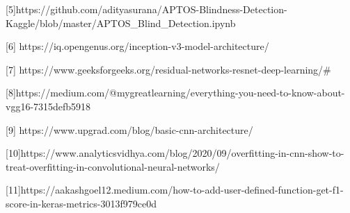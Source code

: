\documentclass[
]{article}
\begin{document}
{[}5{]}https://github.com/adityasurana/APTOS-Blindness-Detection-Kaggle/blob/master/APTOS\_Blind\_Detection.ipynb

{[}6{]} https://iq.opengenus.org/inception-v3-model-architecture/

{[}7{]}
https://www.geeksforgeeks.org/residual-networks-resnet-deep-learning/\#

{[}8{]}https://medium.com/@mygreatlearning/everything-you-need-to-know-about-vgg16-7315defb5918

{[}9{]} https://www.upgrad.com/blog/basic-cnn-architecture/

{[}10{]}https://www.analyticsvidhya.com/blog/2020/09/overfitting-in-cnn-show-to-treat-overfitting-in-convolutional-neural-networks/

{[}11{]}https://aakashgoel12.medium.com/how-to-add-user-defined-function-get-f1-score-in-keras-metrics-3013f979ce0d
\end{document}
